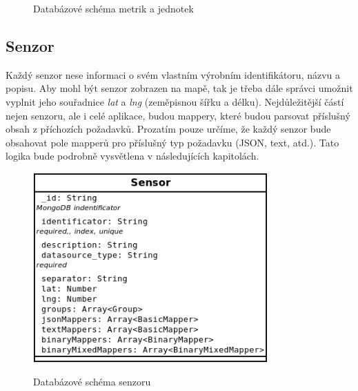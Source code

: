 \documentclass[thesis=M,czech]{FITthesis}[2018/10/20]
\begin{document}
\begin{figure}[h]
\caption{Databázové schéma metrik a jednotek}
\centering
{}%
\label{fig:unit_schema}
%
\label{fig:metric_schema}
\end{figure}

\subsection{Senzor}
Každý senzor nese informaci o svém vlastním výrobním identifikátoru, názvu a popisu. Aby mohl být senzor zobrazen na mapě, tak je třeba dále správci umožnit vyplnit jeho souřadnice \textit{lat} a \textit{lng} (zeměpisnou šířku a délku). Nejdůležitější částí nejen senzoru, ale i celé aplikace, budou mappery, které budou parsovat příslušný obsah z příchozích požadavků. Prozatím pouze určíme, že každý senzor bude obsahovat pole mapperů pro příslušný typ požadavku (JSON, text, atd.). Tato logika bude podrobně vysvětlena v následujících kapitolách.

\begin{figure}[h]
\caption{Databázové schéma senzoru}
\centering
\includegraphics[width=0.80\textwidth]{diagrams/sensor}
\label{fig:sensor_schema}
\end{figure}
\newpage
\end{document}
